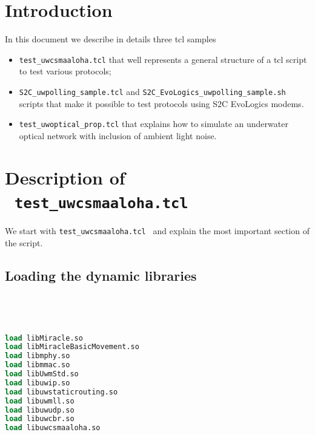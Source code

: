 \documentclass[11pt]{article}
\begin{document}

\begin{center}
    \begin{LARGE}  \end{LARGE}
\end{center}


\vspace{0.8cm}
\section{Introduction}
In this document we describe in details three tcl samples
\begin{itemize}
  \item{\tt test\_uwcsmaaloha.tcl} that well represents a general structure of a tcl script to test various protocols;
  \item{\tt S2C\_uwpolling\_sample.tcl} and {\tt S2C\_EvoLogics\_uwpolling\_sample.sh} scripts that make it possible to test protocols using S2C EvoLogics modems.
  \item{\tt test\_uwoptical\_prop.tcl} that explains how to simulate an underwater optical network with inclusion of ambient light noise.
\end{itemize}



\section{Description of \ {\tt test\_uwcsmaaloha.tcl}}
\label{sec:uwcsmaaloha}

We start with {\tt test\_uwcsmaaloha.tcl } and explain the most important section of the script.



\subsection{Loading the dynamic libraries}
\ 
{\scriptsize\tt
\begin{lstlisting}[language=tcl]
load libMiracle.so
load libMiracleBasicMovement.so
load libmphy.so
load libmmac.so
load libUwmStd.so
load libuwip.so
load libuwstaticrouting.so
load libuwmll.so
load libuwudp.so
load libuwcbr.so
load libuwcsmaaloha.so
\end{lstlisting}
}
\end{document}
